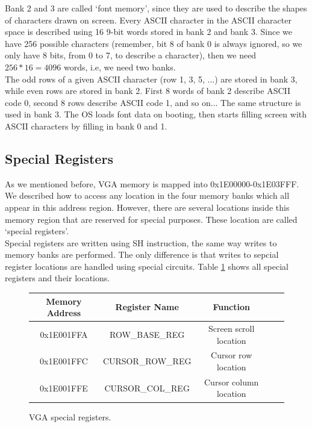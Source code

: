\documentclass[oneside]{book}
\begin{document}
Bank 2 and 3 are called `font memory', since they are used to describe
the shapes of characters drawn on screen. Every ASCII character in the
ASCII character space is described using 16 9-bit words stored in bank 2
and bank 3. Since we have 256 possible characters (remember, bit 8 of
bank 0 is always ignored, so we only have 8 bits, from 0 to 7, to describe
a character), then we need $256*16 = 4096$ words, i.e, we need two banks.\\

The odd rows of a given ASCII character (row 1, 3, 5, ...) are stored in bank
3, while even rows are stored in bank 2. First 8 words of bank 2 describe
ASCII code 0, second 8 rows describe ASCII code 1, and so on... The same
structure is used in bank 3. The OS loads font data on booting, then starts
filling screen with ASCII characters by filling in bank 0 and 1.\\

\subsection{Special Registers}

As we mentioned before, VGA memory is mapped into 0x1E00000-0x1E03FFF.
We described how to access any location in the four memory banks which
all appear in this address region. However, there are several locations
inside this memory region that are reserved for special purposes. These
location are called `special registers'.\\

Special registers are written using SH instruction, the same way writes
to memory banks are performed. The only difference is that writes to
sepcial register locations are handled using special circuits. Table
\ref{vgaregs} shows all special registers and their locations.

\begin{figure}[H]
\begin{center}
\begin{tabular}{|c|c|c|c|c|}

\hline \textbf{Memory Address} & \textbf{Register Name} & \textbf{Function}  \\

\hline 0x1E001FFA & ROW\_BASE\_REG & Screen scroll location \\
\hline 0x1E001FFC & CURSOR\_ROW\_REG & Cursor row location \\
\hline 0x1E001FFE & CURSOR\_COL\_REG & Cursor column location \\
\hline

\end{tabular}
\end{center}
\caption{VGA special registers.}
\label{vgaregs}
\end{figure}
\end{document}
